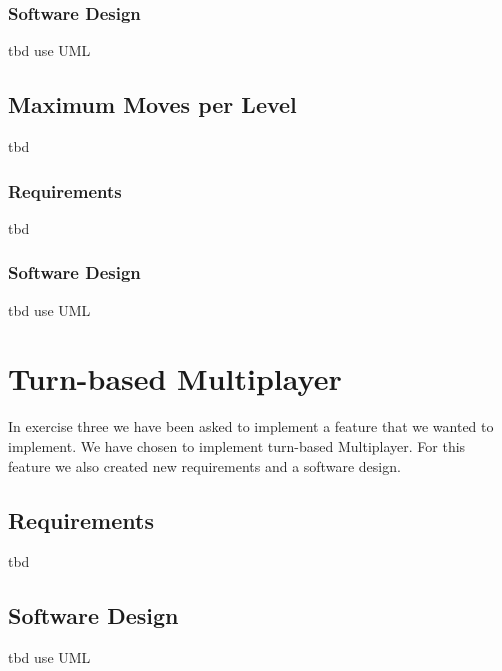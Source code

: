 \documentclass{article}
\begin{document}
\subsubsection{Software Design}
tbd {use UML}

\subsection{Maximum Moves per Level}
tbd

\subsubsection{Requirements}
tbd

\subsubsection{Software Design}
tbd {use UML}


\section{Turn-based Multiplayer}
In exercise three we have been asked to implement a feature that we wanted to implement. We have chosen to implement turn-based Multiplayer. For this feature we also created new requirements and a software design.

\subsection{Requirements}
tbd

\subsection{Software Design}
tbd {use UML}
\end{document}
